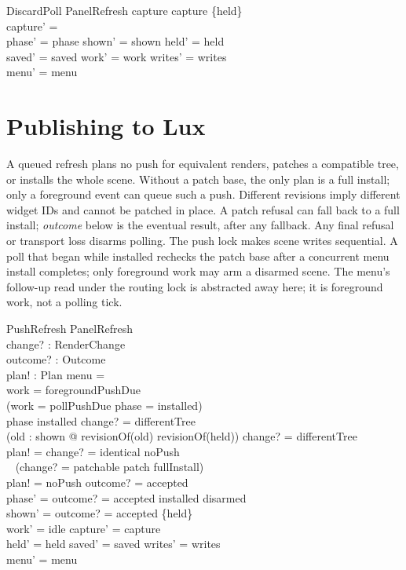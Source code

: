 \documentclass[a4paper,10pt,fleqn]{article}
\begin{document}
\begin{schema}{DiscardPoll}
  \Delta PanelRefresh
\where
  capture \neq \emptyset \land capture \neq \{held\} \\
  capture' = \emptyset \\
  phase' = phase \land shown' = shown \land held' = held \\
  saved' = saved \land work' = work \land writes' = writes \\
  menu' = menu
\end{schema}

\section{Publishing to Lux}

A queued refresh plans no push for equivalent renders, patches a
compatible tree, or installs the whole scene. Without a patch base,
the only plan is a full install; only a foreground event can queue
such a push. Different revisions imply
different widget IDs and cannot be patched in place. A patch refusal
can fall back to a full install; \emph{outcome} below is the eventual
result, after any fallback. Any final refusal or transport loss
disarms polling. The push lock makes scene writes sequential. A poll
that began while installed rechecks the patch base after a concurrent
menu install completes; only foreground work may arm a disarmed
scene. The menu's follow-up read under the routing lock is abstracted
away here; it is foreground work, not a polling tick.

\begin{schema}{PushRefresh}
  \Delta PanelRefresh \\
  change? : RenderChange \\
  outcome? : Outcome \\
  plan! : Plan
\where
  menu = \emptyset \\
  work = foregroundPushDue \\
  \lor (work = pollPushDue \land phase = installed) \\
  phase \neq installed \implies change? = differentTree \\
  (\exists old : shown @ revisionOf(old) \neq revisionOf(held))
    \implies change? = differentTree \\
  plan! = \IF change? = identical \THEN noPush \\
  \quad~ \ELSE (\IF change? = patchable \THEN patch \ELSE fullInstall) \\
  plan! = noPush \implies outcome? = accepted \\
  phase' = \IF outcome? = accepted \THEN installed \ELSE disarmed \\
  shown' = \IF outcome? = accepted \THEN \{held\} \ELSE \emptyset \\
  work' = idle \land capture' = capture \\
  held' = held \land saved' = saved \land writes' = writes \\
  menu' = menu
\end{schema}
\end{document}
